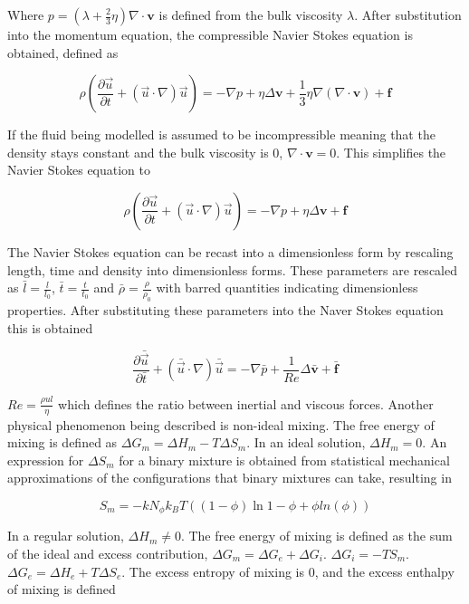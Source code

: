 Where $p = (\lambda + \frac{2}{3}\eta)\nabla \cdot \mathbf{v}$ is defined from the bulk viscosity $\lambda$. After substitution into the momentum equation, the compressible 
Navier Stokes equation is obtained, defined as

\begin{equation}
    \rho (\frac{\partial\vec{u}}{\partial t} + (\vec{u}\cdot\nabla)\vec{u}) = -\nabla p + \eta \Delta \mathbf{v} + \frac{1}{3}\eta \nabla(\nabla \cdot \mathbf{v}) + \mathbf{f}
\end{equation}

If the fluid being modelled is assumed to be incompressible meaning that the density stays constant and the bulk viscosity is 0, $\nabla \cdot \mathbf{v} = 0$. This simplifies
the Navier Stokes equation to

\begin{equation}
    \rho (\frac{\partial\vec{u}}{\partial t} + (\vec{u}\cdot\nabla)\vec{u}) = -\nabla p + \eta \Delta \mathbf{v} + \mathbf{f}
\end{equation}

The Navier Stokes equation can be recast into a dimensionless form by rescaling length, time and density into dimensionless forms. These parameters are rescaled as 
$\bar{l} = \frac{l}{l_0}$, $\bar{t} = \frac{t}{t_0}$ and $\bar{\rho} = \frac{\rho}{\rho_0}$ with barred quantities indicating dimensionless properties. After substituting
these parameters into the Naver Stokes equation this is obtained

\begin{equation}
    \frac{\partial \bar{\vec{u}}}{\partial \bar{t}} + (\bar{\vec{u}} \cdot\nabla)\bar{\vec{u}} = -\nabla \bar{p} + \frac{1}{Re} \Delta \mathbf{\bar{v}} + \bar{\mathbf{f}}
\end{equation}

$Re = \frac{\rho u l}{\eta}$ which defines the ratio between inertial and viscous forces. Another physical phenomenon being described is non-ideal mixing. The free energy of mixing
is defined as $\Delta G_m = \Delta H_m - T \Delta S_m$. In an ideal solution, $\Delta H_m = 0$. An expression for $\Delta S_m$ for a binary mixture is obtained from statistical mechanical 
approximations of the configurations that binary mixtures can take, resulting in 

\begin{equation}
    S_m = -k N_\phi k_B T((1 - \phi)\ln{1 - \phi} + \phi ln(\phi)) 
\end{equation}

In a regular solution, $\Delta H_m \neq 0$. The free energy of mixing is defined as the sum of the ideal and excess contribution, $\Delta G_m = \Delta G_e + \Delta G_i$.
$\Delta G_i = -TS_m$. $\Delta G_e = \Delta H_e + T \Delta S_e$. The excess entropy of mixing is 0, and the excess enthalpy of mixing is defined 


